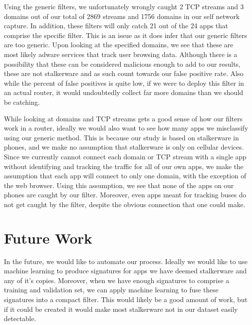 \documentclass[acmtog]{acmart}
\begin{document}
Using the generic filters, we unfortunately wrongly caught 2 TCP streams and 3 domains out of our total of 2869 streams and 1756 domains in our self network capture. In addition, these filters will only catch 21 out of the 24 apps that comprise the specific filter. This is an issue as it does infer that our generic filters are too generic. Upon looking at the specified domains, we see that these are most likely adware services that track user browsing data. Although there is a possibility that these can be considered malicious enough to add to our results, these are not stalkerware and as such count towards our false positive rate. Also while the percent of false positives is quite low, if we were to deploy this filter in an actual router, it would undoubtedly collect far more domains than we should be catching.

While looking at domains and TCP streams gets a good sense of how our filters work in a router, ideally we would also want to see how many apps we misclassify using our generic method. This is because our study is based on stalkerware in phones, and we make no assumption that stalkerware is only on cellular devices. Since we currently cannot connect each domain or TCP stream with a single app without identifying and tracking the traffic for all of our own apps, we make the assumption that each app will connect to only one domain, with the exception of the web browser. Using this assumption, we see that none of the apps on our phones are caught by our filter. Moreover, even apps meant for tracking buses do not get caught by the filter, despite the obvious connection that one could make. 





\section{Future Work}

In the future, we would like to automate our process. Ideally we would like to use machine learning to produce signatures for apps we have deemed stalkerware and any of it's copies. Moreover, when we have enough signatures to comprise a training and validation set, we can apply machine learning to fuse these signatures into a compact filter. This would likely be a good amount of work, but if it could be created it would make most stalkerware not in our dataset easily detectable.
\end{document}
